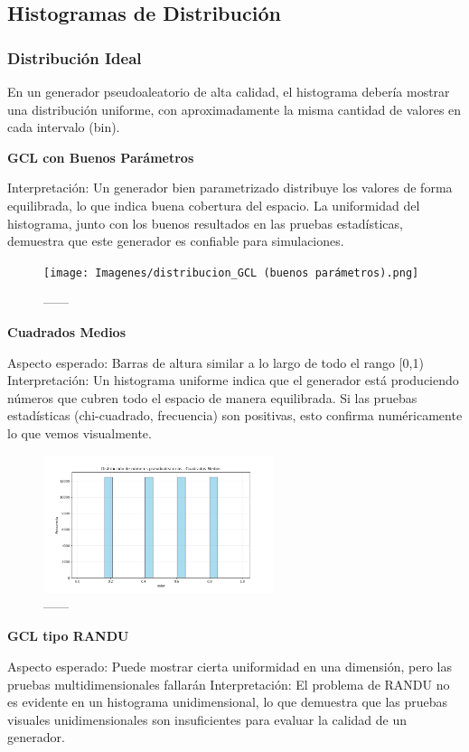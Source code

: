 \documentclass{article}
\begin{document}
\subsection{Histogramas de Distribución}

\subsubsection{Distribución Ideal}
En un generador pseudoaleatorio de alta calidad, el histograma debería mostrar una distribución uniforme, con aproximadamente la misma cantidad de valores en cada intervalo (bin).

\textbf{GCL con Buenos Parámetros}

Interpretación: Un generador bien parametrizado distribuye los valores de forma equilibrada, lo que indica buena cobertura del espacio. La uniformidad del histograma, junto con los buenos resultados en las pruebas estadísticas, demuestra que este generador es confiable para simulaciones.

\begin{figure}[H]
\centering
\texttt{[image: Imagenes/distribucion\_GCL (buenos parámetros).png]}
\caption{------}
\end{figure}

\textbf{Cuadrados Medios}

Aspecto esperado: Barras de altura similar a lo largo de todo el rango [0,1)
Interpretación: Un histograma uniforme indica que el generador está produciendo números que cubren todo el espacio de manera equilibrada. Si las pruebas estadísticas (chi-cuadrado, frecuencia) son positivas, esto confirma numéricamente lo que vemos visualmente.

\begin{figure}[H]
\centering
\includegraphics[width=0.6\textwidth]{Imagenes/distribucion_Cuadrados Medios.png}
\caption{------}
\end{figure}

\textbf{GCL tipo RANDU}

Aspecto esperado: Puede mostrar cierta uniformidad en una dimensión, pero las pruebas multidimensionales fallarán
Interpretación: El problema de RANDU no es evidente en un histograma unidimensional, lo que demuestra que las pruebas visuales unidimensionales son insuficientes para evaluar la calidad de un generador.
\end{document}
